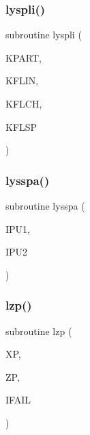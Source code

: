 \mbox{\label{djangoh__l_8f_aa33ce25ab97aa9770a5e2e5f3980fd2e}} 
\subsubsection{\texorpdfstring{lyspli()}{lyspli()}}
{\footnotesize\ttfamily subroutine lyspli (\begin{DoxyParamCaption}\item[{}]{K\+P\+A\+RT,  }\item[{}]{K\+F\+L\+IN,  }\item[{}]{K\+F\+L\+CH,  }\item[{}]{K\+F\+L\+SP }\end{DoxyParamCaption})}

\mbox{\label{djangoh__l_8f_ad96114ee498da69ba22dcdb67af32668}} 
\subsubsection{\texorpdfstring{lysspa()}{lysspa()}}
{\footnotesize\ttfamily subroutine lysspa (\begin{DoxyParamCaption}\item[{}]{I\+P\+U1,  }\item[{}]{I\+P\+U2 }\end{DoxyParamCaption})}

\mbox{\label{djangoh__l_8f_a9a5bd2fc14de05db3e3517f441e0b4fa}} 
\subsubsection{\texorpdfstring{lzp()}{lzp()}}
{\footnotesize\ttfamily subroutine lzp (\begin{DoxyParamCaption}\item[{}]{XP,  }\item[{}]{ZP,  }\item[{}]{I\+F\+A\+IL }\end{DoxyParamCaption})}


